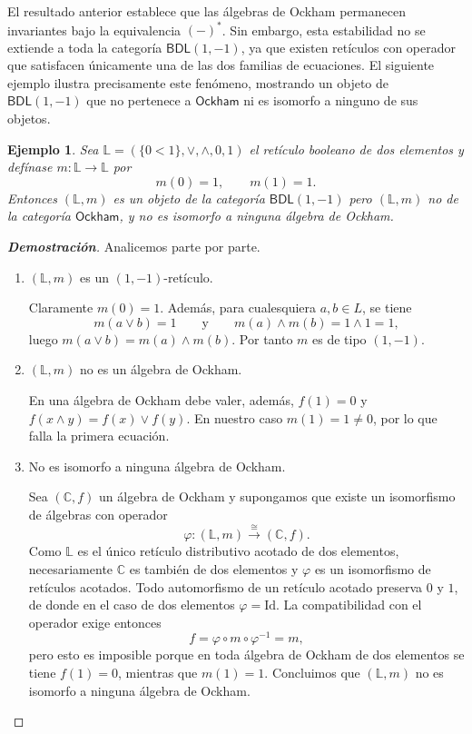 \documentclass[12pt]{book}
\newtheorem{example}{Ejemplo}
\newcommand{\Id}{\mathrm{Id}}
\newcommand{\BDL}{\mathsf{BDL}}
\newcommand{\Ock}{\mathsf{Ockham}}
\begin{document}
El resultado anterior establece que las álgebras de Ockham permanecen invariantes bajo la equivalencia $(-)^*$.
Sin embargo, esta estabilidad no se extiende a toda la categoría $\BDL(1,-1)$, ya que existen retículos con operador que satisfacen únicamente una de las dos familias de ecuaciones.
El siguiente ejemplo ilustra precisamente este fenómeno, mostrando un objeto de $\BDL(1,-1)$ que no pertenece a $\Ock$ ni es isomorfo a ninguno de sus objetos.

\begin{example}\label{ex:bdl11-no-ock}
Sea $\mathbb{L}=(\{0<1\},\vee,\wedge,0,1)$ el retículo booleano de dos elementos y defínase
$m\colon \mathbb{L}\to \mathbb{L}$ por
\[
m(0)=1,\qquad m(1)=1.
\]
Entonces $(\mathbb{L},m)$ es un objeto de la categoría $\BDL(1,-1)$ pero $(\mathbb{L},m)$ no de la categoría $\Ock$, y no es isomorfo a ninguna álgebra de Ockham.
\end{example}

\begin{proof}[\textbf{Demostración}]
Analicemos parte por parte.
\begin{enumerate}
    \item $(\mathbb{L},m)$ es un $(1,-1)$-retículo.
    
Claramente $m(0)=1$. Además, para cualesquiera $a,b\in L$, se tiene
\[
m(a\vee b)=1
\qquad\text{y}\qquad
m(a)\wedge m(b)=1\wedge 1=1,
\]
luego $m(a\vee b)=m(a)\wedge m(b)$. Por tanto $m$ es de tipo $(1,-1)$.

\item $(\mathbb{L},m)$ no es un álgebra de Ockham.

En una álgebra de Ockham debe valer, además, $f(1)=0$ y $f(x\wedge y)=f(x)\vee f(y)$.
En nuestro caso $m(1)=1\neq 0$, por lo que falla la primera ecuación.

\item No es isomorfo a ninguna álgebra de Ockham.

Sea $(\mathbb{C},f)$ un álgebra de Ockham y supongamos que existe un isomorfismo de álgebras con operador
\[
\varphi\colon (\mathbb{L},m)\xrightarrow{\;\cong\;}(\mathbb{C},f).
\]
Como $\mathbb{L}$ es el único retículo distributivo acotado de dos elementos, necesariamente
$\mathbb{C}$ es también de dos elementos y $\varphi$ es un isomorfismo de retículos acotados.
Todo automorfismo de un retículo acotado preserva $0$ y $1$, de donde en el caso de dos elementos
$\varphi=\Id$. La compatibilidad con el operador exige entonces
\[
f = \varphi\circ m\circ \varphi^{-1} = m,
\]
pero esto es imposible porque en toda álgebra de Ockham de dos elementos se tiene $f(1)=0$,
mientras que $m(1)=1$. Concluimos que $(\mathbb{L},m)$ no es isomorfo a ninguna álgebra de Ockham.
\end{enumerate}
\end{proof}
\end{document}
